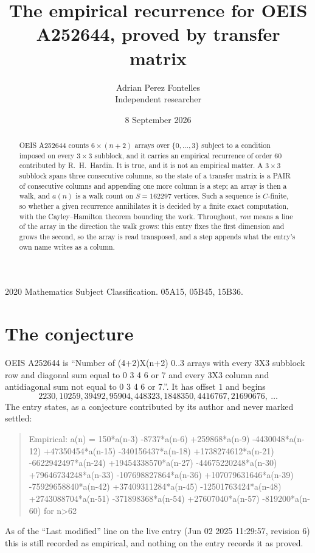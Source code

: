 \documentclass[11pt,a4paper]{article}
\title{The empirical recurrence for OEIS A252644, proved by transfer matrix}
\author{Adrian Perez Fontelles\\ \small Independent researcher}
\date{8 September 2026}
\theoremstyle{plain}
\theoremstyle{definition}
\begin{document}
\maketitle

\begin{abstract}
OEIS A252644 counts $6\times(n+2)$ arrays over $\{0,\dots,3\}$ subject to a condition imposed on
every $3\times3$ subblock, and it carries an empirical recurrence of order $60$
contributed by R.~H.~Hardin. It is true, and it is not an empirical matter. A $3\times3$
subblock spans three consecutive columns, so the state of a transfer matrix is a PAIR of
consecutive columns and appending one more column is a step; an array is then a walk, and
$a(n)$ is a walk count on $S=162297$ vertices. Such a sequence is $C$-finite, so whether a given
recurrence annihilates it is decided by a finite exact computation, with the Cayley--Hamilton
theorem bounding the work.
 Throughout, \emph{row} means a line of the array in the direction the walk grows: this entry fixes the first dimension and grows the second, so the array is read transposed, and a step appends what the entry's own name writes as a column.\end{abstract}

\noindent\small 2020 Mathematics Subject Classification. 05A15, 05B45, 15B36.\normalsize

\section{The conjecture}

OEIS A252644 is ``Number of (4+2)X(n+2) 0..3 arrays with every 3X3 subblock row and diagonal sum equal to 0 3 4 6 or 7 and every 3X3 column and antidiagonal sum not equal to 0 3 4 6 or 7.''. It has offset $1$ and begins
\[
2230, 10259, 39492, 95904, 448323, 1848350, 4416767, 21690676,\ \dots
\]
The entry states, as a conjecture contributed by its author and never marked settled:
\begin{quote}
Empirical: a(n) = 150*a(n-3) -8737*a(n-6) +259868*a(n-9) -4430048*a(n-12) +47350454*a(n-15) -340156437*a(n-18) +1738274612*a(n-21) -6622942497*a(n-24) +19454338570*a(n-27) -44675220248*a(n-30) +79646734248*a(n-33) -107698827864*a(n-36) +107079631646*a(n-39) -75929658840*a(n-42) +37409311284*a(n-45) -12501763424*a(n-48) +2743088704*a(n-51) -371898368*a(n-54) +27607040*a(n-57) -819200*a(n-60) for n>62
\end{quote}
As of the ``Last modified'' line on the live entry (Jun 02 2025 11:29:57, revision 6) this is still
recorded as empirical, and nothing on the entry records it as proved.
\end{document}
